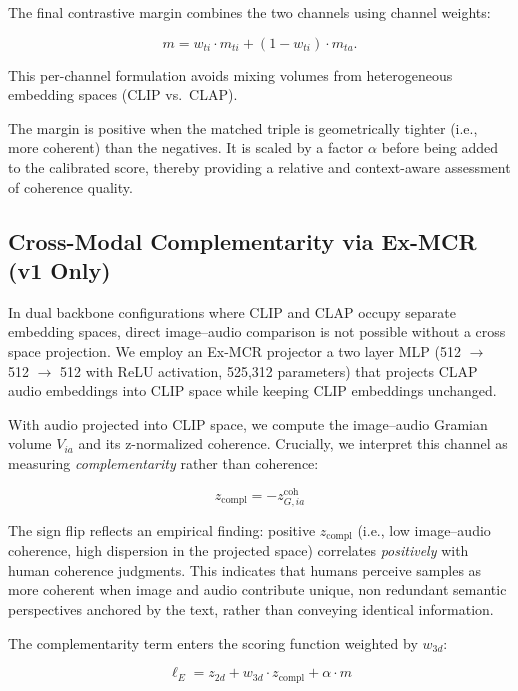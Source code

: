 \documentclass[a4paper,fleqn]{cas-sc}
\begin{document}
\begin{itemize}
The final contrastive margin combines the two channels using channel weights:

\begin{equation}
m =
w_{ti} \cdot m_{ti}
+
(1 - w_{ti}) \cdot m_{ta}.
\end{equation}

This per-channel formulation avoids mixing volumes from heterogeneous embedding spaces (CLIP vs.\ CLAP).

The margin is positive when the matched triple is geometrically tighter (i.e., more coherent) than the negatives. It is scaled by a factor $\alpha$ before being added to the calibrated score, thereby providing a relative and context-aware assessment of coherence quality.

\subsection{Cross-Modal Complementarity via Ex-MCR (v1 Only)}\label{sec:exmcr-complementarity}

In dual backbone configurations where CLIP and CLAP occupy separate embedding spaces, direct image--audio comparison is not possible without a cross space projection. We employ an Ex-MCR projector \citep{wang2024exmcr} a two layer MLP (512 $\to$ 512 $\to$ 512 with ReLU activation, 525,312 parameters) that projects CLAP audio embeddings into CLIP space while keeping CLIP embeddings unchanged.

With audio projected into CLIP space, we compute the image--audio Gramian volume $V_{ia}$ and its z-normalized coherence. Crucially, we interpret this channel as measuring \emph{complementarity} rather than coherence:

\begin{equation}\label{eq:complementarity}
z_{\mathrm{compl}} = -z_{G,ia}^{\mathrm{coh}}
\end{equation}

The sign flip reflects an empirical finding: positive $z_{\mathrm{compl}}$ (i.e., low image--audio coherence, high dispersion in the projected space) correlates \emph{positively} with human coherence judgments. This indicates that humans perceive samples as more coherent when image and audio contribute unique, non redundant semantic perspectives anchored by the text, rather than conveying identical information.

The complementarity term enters the scoring function weighted by $w_{3d}$:

\begin{equation}\label{eq:logit-e}
\ell_E = z_{2d} + w_{3d} \cdot z_{\mathrm{compl}} + \alpha \cdot m
\end{equation}


\end{itemize}
\end{document}
